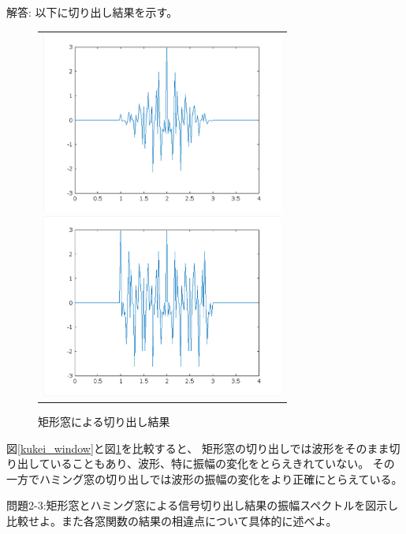 \documentclass[a4paper,11pt]{ltjsarticle}
\begin{document}
解答:
以下に切り出し結果を示す。
\begin{figure}[H]
\begin{center}
\begin{tabular}{c}
\begin{minipage}{0.5\hsize}
\begin{center}
\includegraphics[width=8cm]{DSP1/r1_k2_3.png}
\end{center}
\caption{ハミング窓による切り出し結果}
\label{kukei_window}
\end{minipage}
\begin{minipage}{0.5\hsize}
\begin{center}
\includegraphics[width=8cm]{DSP1/R1_K2_6_kukei.png}
\end{center}
\caption{矩形窓による切り出し結果}
\label{hamming_window}
\end{minipage}
\end{tabular}
\end{center}
\end{figure}

図\ref{kukei_window}と図\ref{hamming_window}を比較すると、
矩形窓の切り出しでは波形をそのまま切り出していることもあり、波形、特に振幅の変化をとらえきれていない。
その一方でハミング窓の切り出しでは波形の振幅の変化をより正確にとらえている。

問題2-3:矩形窓とハミング窓による信号切り出し結果の振幅スペクトルを図示し
比較せよ。また各窓関数の結果の相違点について具体的に述べよ。
\end{document}
